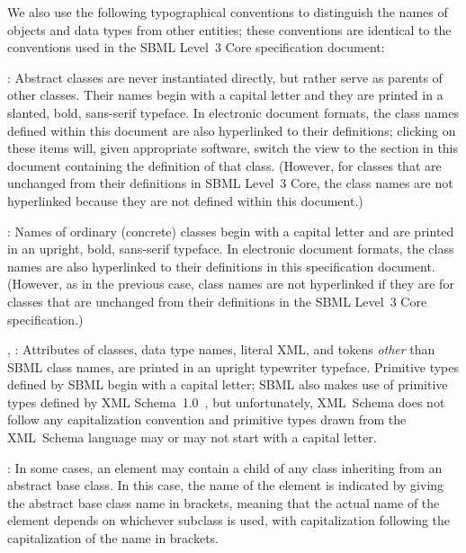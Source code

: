 \documentclass[draftspec]{sbmlpkgspec}
\begin{document}
We also use the following typographical conventions to distinguish the
names of objects and data types from other entities; these conventions
are identical to the conventions used in the SBML Level~3 Core specification
document:

\begin{description}
  
\item {}: Abstract classes are never
  instantiated directly, but rather serve as parents of other classes.
  Their names begin with a capital letter and they are printed in a
  slanted, bold, sans-serif typeface.  In electronic document formats,
  the class names defined within this document are also hyperlinked to
  their definitions; clicking on these items will, given appropriate
  software, switch the view to the section in this document containing
  the definition of that class.  (However, for classes that are
  unchanged from their definitions in SBML Level~3 Core, the class names
  are not hyperlinked because they are not defined within this
  document.)
  
\item {}: Names of ordinary (concrete) classes begin with a
  capital letter and are printed in an upright, bold, sans-serif
  typeface.  In electronic document formats, the class names are also
  hyperlinked to their definitions in this specification document.
  (However, as in the previous case, class names are not hyperlinked if
  they are for classes that are unchanged from their definitions in the
  SBML Level~3 Core specification.)

\item {}, : Attributes of classes, data
  type names, literal XML, and tokens \emph{other} than SBML class
  names, are printed in an upright typewriter typeface.  Primitive types
  defined by SBML begin with a capital letter; SBML also makes use of
  primitive types defined by XML
  Schema~1.0~\citep{biron:2000,fallside:2000,thompson:2000}, but
  unfortunately, XML~Schema does not follow any capitalization
  convention and primitive types drawn from the XML~Schema language may
  or may not start with a capital letter.

\item \token{[elementName]}:  In some cases, an element may contain a child of any class inheriting from an abstract base class.  In this case, the name of the element is indicated by giving the abstract base class name in brackets, meaning that the actual name of the element depends on whichever subclass is used, with capitalization following the capitalization of the name in brackets.

\end{description}
\end{document}
